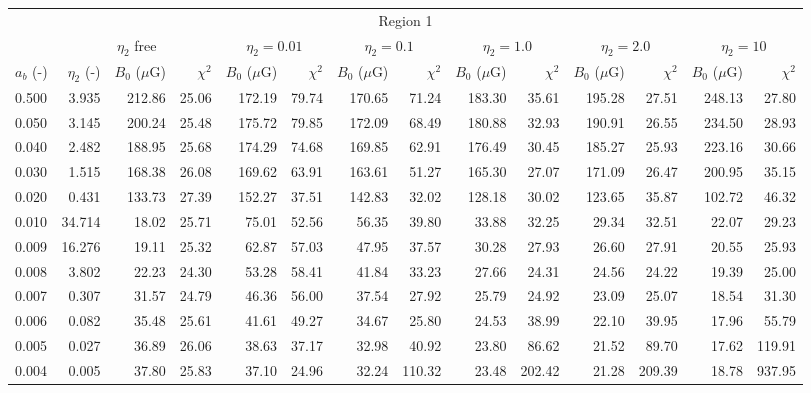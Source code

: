 \begin{tabular}{@{}lrrrrrrrrrrrrr@{}}
\toprule
\multicolumn{14}{c}{Region 1} \\
\cmidrule{1-14}
{} & \multicolumn{3}{c}{$\eta_2$ free} & \multicolumn{2}{c}{$\eta_2 = 0.01$}
   & \multicolumn{2}{c}{$\eta_2 = 0.1$} & \multicolumn{2}{c}{$\eta_2 = 1.0$}
   & \multicolumn{2}{c}{$\eta_2 = 2.0$} & \multicolumn{2}{c}{$\eta_2 = 10$} \\
\cmidrule(lr){2-4} \cmidrule(lr){5-6} \cmidrule(lr){7-8} \cmidrule(lr){9-10}
    \cmidrule(lr){11-12} \cmidrule(lr){13-14}
$a_b$ (-) & $\eta_2$ (-) & $B_0$ ($\mu$G) & $\chi^2$
& $B_0$ ($\mu$G) & $\chi^2$ & $B_0$ ($\mu$G) & $\chi^2$
& $B_0$ ($\mu$G) & $\chi^2$ & $B_0$ ($\mu$G) & $\chi^2$
& $B_0$ ($\mu$G) & $\chi^2$ \\
\cmidrule{1-14}
0.500 & 3.935 & 212.86 & 25.06 & 172.19 & 79.74 & 170.65 & 71.24 & 183.30 & 35.61 & 195.28 & 27.51 & 248.13 & 27.80 \\
0.050 & 3.145 & 200.24 & 25.48 & 175.72 & 79.85 & 172.09 & 68.49 & 180.88 & 32.93 & 190.91 & 26.55 & 234.50 & 28.93 \\
0.040 & 2.482 & 188.95 & 25.68 & 174.29 & 74.68 & 169.85 & 62.91 & 176.49 & 30.45 & 185.27 & 25.93 & 223.16 & 30.66 \\
0.030 & 1.515 & 168.38 & 26.08 & 169.62 & 63.91 & 163.61 & 51.27 & 165.30 & 27.07 & 171.09 & 26.47 & 200.95 & 35.15 \\
0.020 & 0.431 & 133.73 & 27.39 & 152.27 & 37.51 & 142.83 & 32.02 & 128.18 & 30.02 & 123.65 & 35.87 & 102.72 & 46.32 \\
0.010 & 34.714 & 18.02 & 25.71 & 75.01 & 52.56 & 56.35 & 39.80 & 33.88 & 32.25 & 29.34 & 32.51 & 22.07 & 29.23 \\
0.009 & 16.276 & 19.11 & 25.32 & 62.87 & 57.03 & 47.95 & 37.57 & 30.28 & 27.93 & 26.60 & 27.91 & 20.55 & 25.93 \\
0.008 & 3.802 & 22.23 & 24.30 & 53.28 & 58.41 & 41.84 & 33.23 & 27.66 & 24.31 & 24.56 & 24.22 & 19.39 & 25.00 \\
0.007 & 0.307 & 31.57 & 24.79 & 46.36 & 56.00 & 37.54 & 27.92 & 25.79 & 24.92 & 23.09 & 25.07 & 18.54 & 31.30 \\
0.006 & 0.082 & 35.48 & 25.61 & 41.61 & 49.27 & 34.67 & 25.80 & 24.53 & 38.99 & 22.10 & 39.95 & 17.96 & 55.79 \\
0.005 & 0.027 & 36.89 & 26.06 & 38.63 & 37.17 & 32.98 & 40.92 & 23.80 & 86.62 & 21.52 & 89.70 & 17.62 & 119.91 \\
0.004 & 0.005 & 37.80 & 25.83 & 37.10 & 24.96 & 32.24 & 110.32 & 23.48 & 202.42 & 21.28 & 209.39 & 18.78 & 937.95 \\


\end{tabular}
